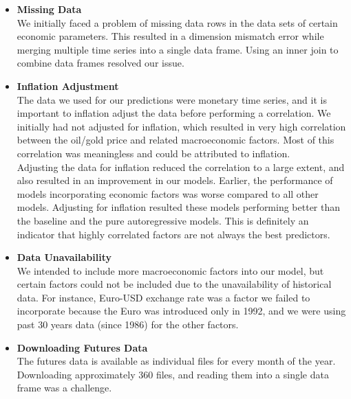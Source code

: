 \documentclass[runningheads]{llncs}
\begin{document}
\begin{itemize}

\item \textbf{Missing Data} \\
We initially faced a problem of missing data rows in the data sets of certain economic parameters. This resulted in a dimension mismatch error while merging multiple time series into a single data frame. Using an inner join to combine data frames resolved our issue. \\

\item \textbf{Inflation Adjustment} \\
The data we used for our predictions were monetary time series, and it is important to inflation adjust the data before performing a correlation. We initially had not adjusted for inflation, which resulted in very high correlation between the oil/gold price and related macroeconomic factors. Most of this correlation was meaningless and could be attributed to inflation. \\

Adjusting the data for inflation reduced the correlation to a large extent, and also resulted in an improvement in our models. Earlier, the performance of models incorporating economic factors was worse compared to all other models. Adjusting for inflation resulted these models performing better than the baseline and the pure autoregressive models. This is definitely an indicator that highly correlated factors are not always the best predictors. \\

\item \textbf{Data Unavailability} \\
We intended to include more macroeconomic factors into our model, but certain factors could not be included due to the unavailability of historical data. For instance, Euro-USD exchange rate was a factor we failed to incorporate because the Euro was introduced only in 1992, and we were using past 30 years data (since 1986) for the other factors.  \\

\item \textbf{Downloading Futures Data} \\
The futures data is available as individual files for every month of the year. Downloading approximately 360 files, and reading them into a single data frame was a challenge. \\


\end{itemize}
\end{document}
